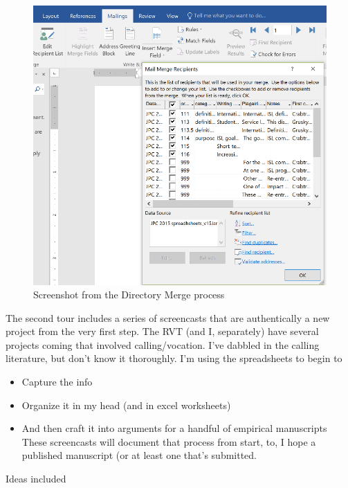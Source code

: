 \documentclass[
  english,
]{book}
\providecommand{\tightlist}{%
  \setlength{\itemsep}{0pt}\setlength{\parskip}{0pt}}
\begin{document}
\begin{figure}
\centering
\includegraphics{images/Excel/DirectoryMerge.png}
\caption{Screenshot from the Directory Merge process}
\end{figure}

The second tour includes a series of screencasts that are authentically a new project from the very first step. The RVT (and I, separately) have several projects coming that involved calling/vocation. I've dabbled in the calling literature, but don't know it thoroughly. I'm using the spreadsheets to begin to

\begin{itemize}
\tightlist
\item
  Capture the info
\item
  Organize it in my head (and in excel worksheets)
\item
  And then craft it into arguments for a handful of empirical manuscripts
  These screencasts will document that process from start, to, I hope a published manuscript (or at least one that's submitted.
\end{itemize}

Ideas included
\end{document}
